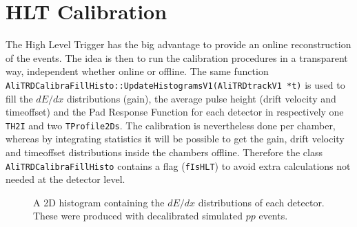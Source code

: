 \documentclass{alicetdr}
\begin{document}
\section{HLT Calibration}
The High Level Trigger has the big advantage to provide an online 
reconstruction of the events. The idea is then to run the calibration 
procedures in a transparent way, independent whether online or 
offline. The same function 
\\{\tt AliTRDCalibraFillHisto::UpdateHistogramsV1(AliTRDtrackV1 *t)} 
is used to fill the $dE/dx$ distributions (gain), the average pulse 
height (drift velocity and timeoffset) and the Pad Response Function 
for each detector in respectively one {\tt TH2I} and two 
{\tt TProfile2Ds}. The calibration is nevertheless done per chamber, 
whereas by integrating statistics it will be possible to get the gain, 
drift velocity and timeoffset distributions inside the chambers offline. 
Therefore the class {\tt AliTRDCalibraFillHisto} contains a flag 
({\tt fIsHLT}) to avoid extra calculations not needed at the detector 
level.\\
\begin{figure}[hbt]
  \centering\mbox{}
  \caption{\label{referencech2d}A 2D histogram containing the 
$dE$$/$$dx$ distributions of each detector. These were produced 
with decalibrated simulated $pp$ events.}
\end{figure}
\end{document}
